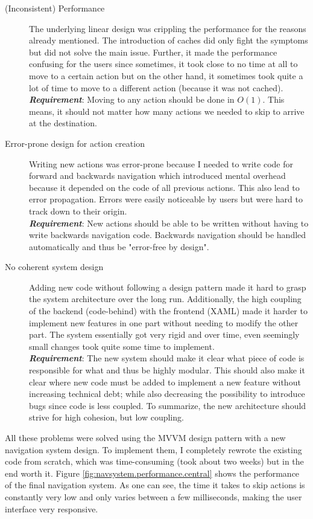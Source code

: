 \begin{description}
\item [(Inconsistent) Performance] The underlying linear design was crippling the performance for the reasons already mentioned. The introduction of caches did only fight the symptoms but did not solve the main issue. Further, it made the performance confusing for the users since sometimes, it took close to no time at all to move to a certain action but on the other hand, it sometimes took quite a lot of time to move to a different action (because it was not cached). \\
\textit{\textbf{Requirement}}: Moving to any action should be done in $O(1)$. This means, it should not matter how many actions we needed to skip to arrive at the destination.
\item [Error-prone design for action creation] Writing new actions was error-prone because I needed to write code for forward and backwards navigation which introduced mental overhead because it depended on the code of all previous actions. This also lead to error propagation. Errors were easily noticeable by users but were hard to track down to their origin.\\
\textit{\textbf{Requirement}}: New actions should be able to be written without having to write backwards navigation code. Backwards navigation should be handled automatically and thus be "error-free by design".
\item [No coherent system design] Adding new code without following a design pattern made it hard to grasp the system architecture over the long run. Additionally, the high coupling of the backend (code-behind) with the frontend (XAML) made it harder to implement new features in one part without needing to modify the other part. The system essentially got very rigid and over time, even seemingly small changes took quite some time to implement.\\
\textit{\textbf{Requirement}}: The new system should make it clear what piece of code is responsible for what and thus be highly modular. This should also make it clear where new code must be added to implement a new feature without increasing technical debt; while also decreasing the possibility to introduce bugs since code is less coupled. To summarize, the new architecture should strive for high cohesion, but low coupling.
\end{description}

All these problems were solved using the MVVM design pattern with a new navigation system design. To implement them, I completely rewrote the existing code from scratch, which was time-consuming (took about two weeks) but in the end worth it. Figure \ref{fig:navsystem.performance.central} shows the performance of the final navigation system. As one can see, the time it takes to skip actions is constantly very low and only varies between a few milliseconds, making the user interface very responsive.